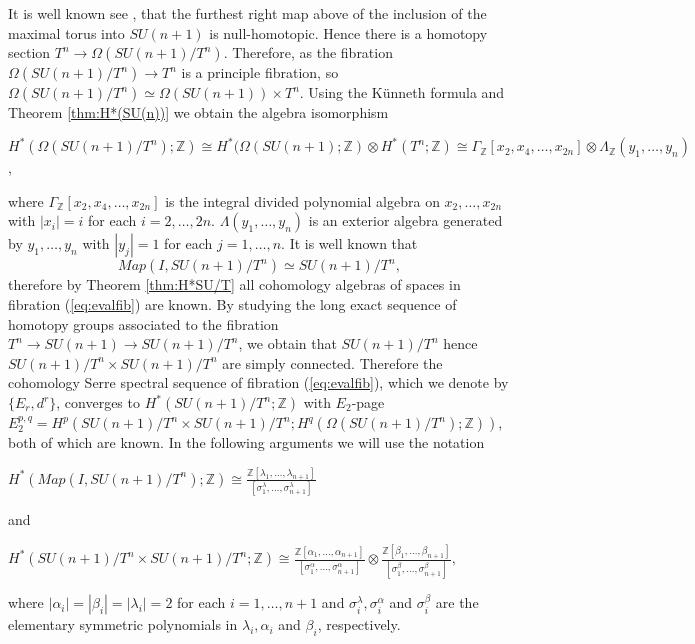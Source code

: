 \documentclass{article}
\theoremstyle{plain}
\theoremstyle{definition}
\numberwithin{thm}{section}
\begin{document}
			It is well known see \cite{CohomologyOmega(G/U)}, that the furthest right map above of the inclusion of the maximal torus into $SU(n+1)$ is null-homotopic.
			Hence there is a homotopy section $T^n \to \Omega(SU(n+1)/T^n)$.
			Therefore, as the fibration $\Omega(SU(n+1)/T^n) \to T^n$ is a principle fibration, so $\Omega(SU(n+1)/T^n) \simeq \Omega(SU(n+1)) \times T^n$.
			Using the K\"{u}nneth formula and Theorem \ref{thm:H*(SU(n))} we obtain the algebra isomorphism
			
			\begin{center}
			$H^*(\Omega(SU(n+1)/T^n);\mathbb{Z}) \cong H^*(\Omega(SU(n+1);\mathbb{Z}) \otimes H^*(T^n;\mathbb{Z})
			\cong \Gamma_{\mathbb{Z}}[x_2,x_4,\dots,x_{2n}] \otimes \Lambda_{\mathbb{Z}}(y_1,\dots,y_n)$,
			\end{center}
			where $\Gamma_{\mathbb{Z}}[x_2,x_4,\dots,x_{2n}]$ is the integral divided polynomial algebra on $x_2,\dots,x_{2n}$
			with $|x_i|=i$ for each $i=2,\dots,2n$.
			$\Lambda(y_1,\dots,y_n)$ is an exterior algebra generated by $y_1,\dots,y_n$
			with $|y_j|=1$ for each $j=1,\dots,n$.
			It is well known that
			\begin{equation*}
				Map(I,SU(n+1)/T^n)\simeq SU(n+1)/T^n,
			\end{equation*}
			therefore by Theorem \ref{thm:H*SU/T} 
			all cohomology algebras of spaces in fibration (\ref{eq:evalfib}) are known.
			By studying the long exact sequence of homotopy groups associated to the fibration $T^n \to SU(n+1) \to SU(n+1)/T^n$,
			we obtain that $SU(n+1)/T^n$ hence $SU(n+1)/T^n \times SU(n+1)/T^n$ are simply connected.
			Therefore the cohomology Serre spectral sequence of fibration (\ref{eq:evalfib}), which we denote by $\{E_r,d^r\}$, 
			converges to $H^*(SU(n+1)/T^n;\mathbb{Z})$ with $E_2$-page $E^{p,q}_2=H^p(SU(n+1)/T^n\times SU(n+1)/T^n;H^q(\Omega(SU(n+1)/T^n);\mathbb{Z}))$, both of which are known.
			In the following arguments we will use the notation
			
			\begin{center}
			$H^*(Map(I,SU(n+1)/T^n);\mathbb{Z}) \cong \frac{\mathbb{Z}[\lambda_1,\dots,\lambda_{n+1}]}{[\sigma^{\lambda}_1,\dots,\sigma^{\lambda}_{n+1}]}$
			\end{center}
			and
			\begin{center}
			$H^*(SU(n+1)/T^n \times SU(n+1)/T^n;\mathbb{Z}) \cong 
			\frac{\mathbb{Z}[\alpha_1,\dots,\alpha_{n+1}]}{[\sigma^{\alpha}_1,\dots,\sigma^{\alpha}_{n+1}]} \otimes
			\frac{\mathbb{Z}[\beta_1,\dots,\beta_{n+1}]}{[\sigma^{\beta}_1,\dots,\sigma^{\beta}_{n+1}]}
			,$
			\end{center}
			where $|\alpha_i|=|\beta_i|=|\lambda_i|=2$ for each $i=1,\dots,n+1$ and $\sigma^{\lambda}_i,\sigma^{\alpha}_i$
			and $\sigma^{\beta}_i$ are the elementary symmetric polynomials in $\lambda_i,\alpha_i$ and $\beta_i$, respectively.
			
\end{document}
